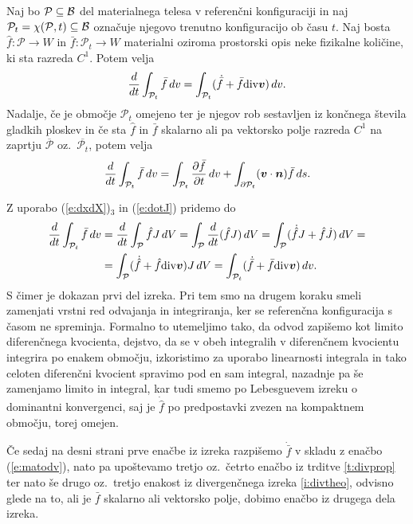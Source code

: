 \begin{izrek} \label{i:transport}
	Naj bo $\mathcal{P}\subseteq\mathcal B$ del materialnega telesa v referenčni konfiguraciji in naj
	$\mathcal{P}_t=\chi(\mathcal{P},t)\subseteq\mathcal B$ označuje njegovo trenutno konfiguracijo ob času $t$.
	Naj bosta $\hat{f}\colon\mathcal{P}\to W$ in $\bar{f}\colon\mathcal{P}_t\to W$
	materialni oziroma prostorski opis neke fizikalne količine, ki sta razreda $C^1$. Potem velja
	\begin{equation*}
		\frac{d}{dt}\int_{\mathcal{P}_t}\bar{f}\,dv =
		\int_{\mathcal{P}_t}(\dot{\bar{f}}+\bar{f}\mathrm{div}\boldsymbol v)\,dv.
	\end{equation*}
	Nadalje, če je območje $\mathcal{P}_t$ omejeno ter je njegov rob sestavljen iz končnega števila
	gladkih ploskev in če sta $\hat{f}$ in $\bar{f}$ skalarno ali pa vektorsko polje
	razreda $C^1$ na zaprtju $\overline{\mathcal{P}}$ oz.~$\overline{\mathcal{P}_t}$, potem velja
	\begin{equation*}
		\frac{d}{dt}\int_{\mathcal{P}_t}\bar{f}\,dv =
		\int_{\mathcal{P}_t}\frac{\partial\bar{f}}{\partial t}\,dv +
		\int_{\partial\mathcal{P}_t}(\boldsymbol v\cdot\boldsymbol n)\bar{f}\,ds.
	\end{equation*}
\end{izrek}
\proof
	Z uporabo (\ref{e:dxdX})${}_3$ in (\ref{e:dotJ}) pridemo do
	\begin{align*}
		\frac{d}{dt}\int_{\mathcal{P}_t}\bar{f}\,dv &= \frac{d}{dt}\int_{\mathcal{P}}\hat{f}J\,dV =
		\int_{\mathcal{P}}\frac{d}{dt}(\hat{f}J)\,dV = \int_{\mathcal{P}}(\dot{\hat{f}}J+\hat{f}\dot{J})\,dV =\\
		&=\int_{\mathcal{P}}(\dot{\hat{f}}+\hat{f}\mathrm{div}\boldsymbol v)J\,dV = \int_{\mathcal{P}_t}(\dot{\bar{f}}+\bar{f}\mathrm{div}\boldsymbol v)\,dv.
	\end{align*}
	S čimer je dokazan prvi del izreka.
	Pri tem smo na drugem koraku smeli zamenjati vrstni red odvajanja in integriranja, ker se referenčna konfiguracija
	s časom ne spreminja. Formalno to utemeljimo tako, da odvod zapišemo kot limito diferenčnega kvocienta,
	dejstvo, da se v obeh integralih v diferenčnem kvocientu integrira po enakem območju, izkoristimo za uporabo
	linearnosti integrala in tako celoten diferenčni kvocient spravimo pod en sam integral, nazadnje pa še zamenjamo
	limito in integral, kar tudi smemo po Lebesguevem izreku o dominantni konvergenci, saj je $\dot{\hat{f}}$
	po predpostavki zvezen \textcolor[rgb]{1,0,0}{na kompaktnem območju}, torej omejen.
	
	Če sedaj na desni strani prve enačbe iz izreka razpišemo $\dot{\bar{f}}$ v skladu z enačbo (\ref{e:matodv}),
	nato pa upoštevamo tretjo oz.~četrto enačbo iz trditve \ref{t:divprop} ter nato še drugo oz.~tretjo enakost
	iz divergenčnega izreka \ref{i:divtheo}, odvisno glede na to, ali je $\bar{f}$ skalarno ali
	vektorsko polje, dobimo enačbo iz drugega dela izreka.
\endproof

